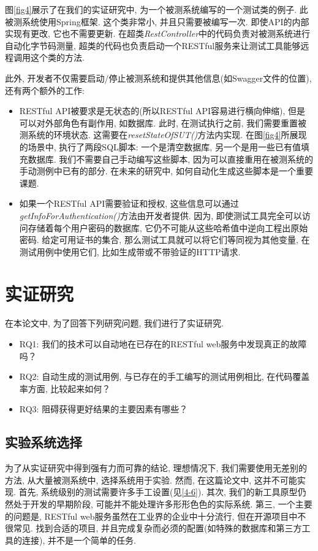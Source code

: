     图\ref{fig4}展示了在我们的实证研究中, 为一个被测系统编写的一个测试类的例子. 此被测系统使用Spring框架. 这个类非常小, 并且只需要被编写一次. 即使API的内部实现有更改, 它也不需要更新. 在超类\textit{RestController}中的代码负责对被测系统进行自动化字节码测量, 超类的代码也负责启动一个RESTful服务来让测试工具能够远程调用这个类的方法. 
    
    此外, 开发者不仅需要启动/停止被测系统和提供其他信息(如Swagger文件的位置), 还有两个额外的工作: 
    \begin{itemize}
      \item RESTful API被要求是无状态的(所以RESTful API容易进行横向伸缩), 但是可以对外部角色有副作用, 如数据库. 此时, 在测试执行之前, 我们需要重置被测系统的环境状态. 这需要在\textit{resetStateOfSUT()}方法内实现. 在图\ref{fig4}所展现的场景中, 执行了两段SQL脚本: 一个是清空数据库, 另一个是用一些已有值填充数据库. 我们不需要自己手动编写这些脚本, 因为可以直接重用在被测系统的手动测例中已有的部分. 在未来的研究中, 如何自动化生成这些脚本是一个重要课题. 
        
        \item 如果一个RESTful API需要验证和授权, 这些信息可以通过\textit{getInfoForAuthentication()}方法由开发者提供. 因为, 即使测试工具完全可以访问存储着每个用户密码的数据库, 它仍不可能从这些哈希值中逆向工程出原始密码. 给定可用证书的集合, 那么测试工具就可以将它们等同视为其他变量, 在测试用例中使用它们, 比如生成带或不带验证的HTTP请求. 
    \end{itemize}

\section{实证研究}
  在本论文中, 为了回答下列研究问题, 我们进行了实证研究. 
    \begin{itemize}
      \item RQ1: 我们的技术可以自动地在已存在的RESTful web服务中发现真正的故障吗？
      \item RQ2: 自动生成的测试用例, 与已存在的手工编写的测试用例相比, 在代码覆盖率方面, 比较起来如何？
        \item RQ3: 阻碍获得更好结果的主要因素有哪些？
    \end{itemize}
    
    \subsection{实验系统选择}
      为了从实证研究中得到强有力而可靠的结论, 理想情况下, 我们需要使用无差别的方法, 从大量被测系统中, 选择系统用于实验\cite{fraser2012sound}. 然而, 在这篇论文中, 这并不可能实现. 首先, 系统级别的测试需要许多手工设置(见\ref{4-6}). 其次, 我们的新工具原型仍然处于开发的早期阶段, 可能并不能处理许多形形色色的实际系统. 第三, 一个主要的问题是, RESTful web服务虽然在工业界的企业中十分流行, 但在开源项目中不很常见. 找到合适的项目, 并且完成复杂而必须的配置(如特殊的数据库和第三方工具的连接), 并不是一个简单的任务. 
        
